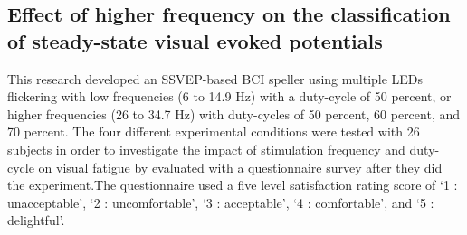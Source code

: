 \subsection {Effect of higher frequency on the classiﬁcation of steady-state visual evoked potentials\cite{ref7}}

\hspace{1.5cm}This research developed an SSVEP-based BCI speller using multiple LEDs flickering with low frequencies (6 to 14.9 Hz) with a duty-cycle of 50 percent, or higher frequencies (26 to 34.7 Hz) with duty-cycles of 50 percent, 60 percent, and 70 percent. The four different experimental conditions were tested with 26 subjects in order to investigate the impact of stimulation frequency and duty-cycle on visual fatigue by evaluated with a questionnaire survey after they did the experiment.The questionnaire used a five level satisfaction rating score of ‘1 : unacceptable’, ‘2 : uncomfortable’, ‘3 : acceptable’, ‘4 : comfortable’, and ‘5 : delightful’.


